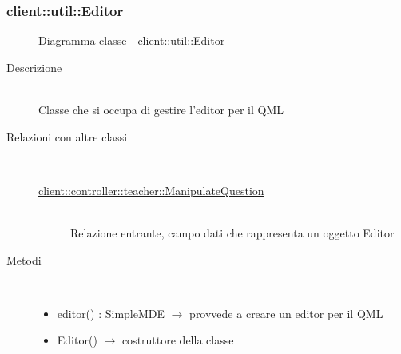 \vspace{0.5cm}
\hypertarget{client::util::Editor}{}
\subsubsection[Editor]{client::util::Editor}
\begin{figure}[H]
	\centering
	\caption{Diagramma classe - client::util::Editor}
\end{figure}\begin{description}
\item[Descrizione] \hfill \\
Classe che si occupa di gestire l'editor per il QML
\item[Relazioni con altre classi] \hfill \\
\vspace{-7mm}
\begin{description}
	\item[\hyperlink{client::controller::teacher::ManipulateQuestion}{client::controller::teacher::ManipulateQuestion}] \hfill \\
	Relazione entrante, campo dati che rappresenta un oggetto Editor
\end{description}

\item[Metodi] \hfill \\
\vspace{-7mm}
\begin{itemize}
	\item editor() : SimpleMDE $\rightarrow$ provvede a creare un editor per il QML
	\item Editor() $\rightarrow$ costruttore della classe
\end{itemize}

\end{description}

\vspace{0.5cm}

